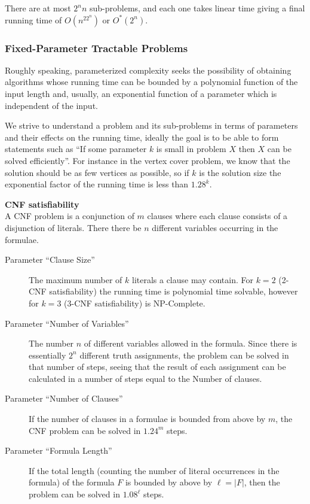 There are at most $2^nn$ sub-problems, and each one takes linear time giving a final running time of $O(n^22^n)$ or $O^*(2^n)$.



\subsubsection{Fixed-Parameter Tractable Problems}
Roughly speaking, parameterized complexity seeks the possibility of obtaining
algorithms whose running time can be bounded by a polynomial function of the
input length and, usually, an exponential function of a parameter which is independent of the input.

We strive to understand a problem and its sub-problems in terms of parameters and their effects on the
running time, ideally the goal is to be able to form statements such as ``If some parameter $k$ is
small in problem $X$ then $X$ can be solved efficiently''. For instance in the vertex cover problem, we know that the solution
should be as few vertices as possible, so if $k$ is the solution size the exponential factor of the running time is less than $1.28^k$.

\noindent\textbf{CNF satisfiability}\\
A CNF problem is a conjunction of $m$ clauses where each clause consists of a disjunction of literals.
There there be $n$ different variables occurring in the formulae.

\begin{description}
\item[Parameter ``Clause Size''] The maximum number of $k$ literals a clause
  may contain. For $k = 2$ (2-CNF satisfiability) the running time is polynomial
  time solvable, however for $k = 3$ (3-CNF satisfiability) is NP-Complete.

\item[Parameter ``Number of Variables''] The number $n$ of different variables
  allowed in the formula. Since there is essentially $2^n$ different truth
  assignments, the problem can be solved in that number of steps, seeing that
  the result of each assignment can be calculated in a number of steps equal to
  the Number of clauses.

\item[Parameter ``Number of Clauses''] If the number of clauses in a formulae is
  bounded from above by $m$, the CNF problem can be solved in $1.24^m$ steps.

\item[Parameter ``Formula Length''] If the total length (counting the number of
  literal occurrences in the formula) of the formula $F$ is bounded by above by
  $\ell = |F|$, then the problem can be solved in $1.08^\ell$ steps.
\end{description}


